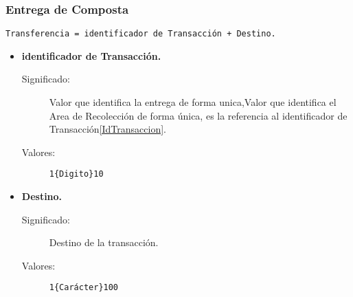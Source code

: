 \subsubsection{Entrega de Composta}
\begin{lstlisting}
Transferencia = identificador de Transacción + Destino.
\end{lstlisting}
\lstset{breaklines=true}
	\begin{itemize}
		\item \textbf{identificador de Transacción.}
			\begin{description}
				\item [Significado:] Valor que identifica la entrega de forma unica,Valor que identifica el Area de Recolección de forma única, es la referencia al identificador de Transacción\ref{IdTransaccion}.
				\item [Valores:]{\begin{lstlisting}
1{Digito}10\end{lstlisting}}
			\end{description}

		\item \textbf{Destino.}
			\begin{description}
				\item [Significado:] Destino de la transacción.
				\item [Valores:]{\begin{lstlisting}
1{Carácter}100\end{lstlisting}}
			\end{description}
	\end{itemize}

